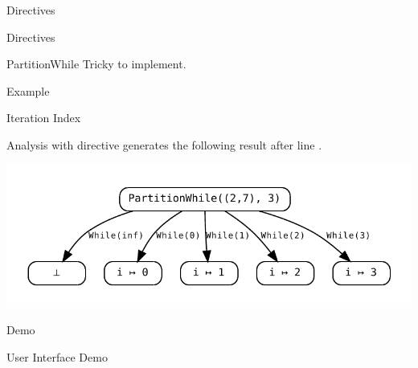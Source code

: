 \documentclass{beamer}
\begin{document}
\begin{section}{Directives}
\begin{frame}[t]{Directives}
\begin{block}{PartitionWhile}
			Tricky to implement.
		\end{block}
	\end{frame}

	\begin{frame}[t]{Example}
		\begin{block}{Iteration Index}
			
			Analysis with  directive generates the following result after line .
			\begin{center}
				\includegraphics[width=\textwidth]{Graphs/PartitionWhileExample.pdf}
			\end{center}
		\end{block}
	\end{frame}


	\begin{frame}{Demo}
		\begin{center}
			\large{User Interface Demo}
		\end{center}
	\end{frame}

\end{section} 

\end{document}
